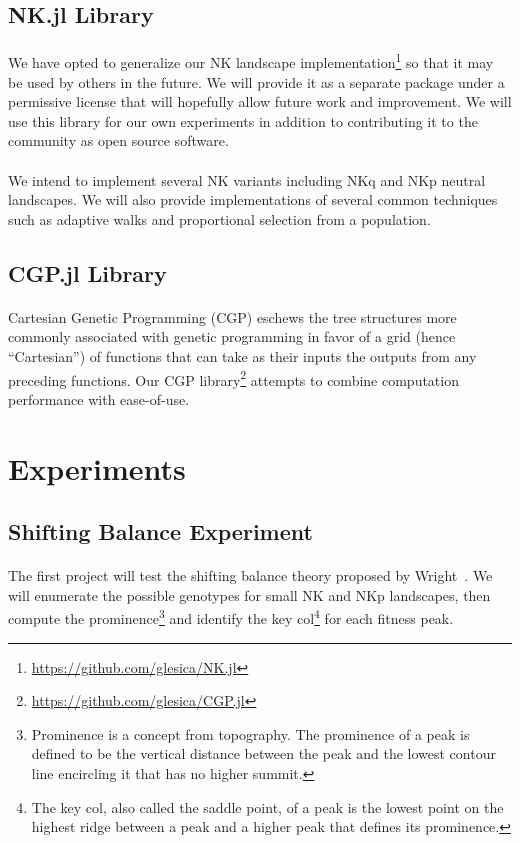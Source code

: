 \documentclass[12pt,letterpaper,titlepage]{article}
\begin{document}
\subsection{NK.jl Library}

\paragraph{}
We have opted to generalize our NK landscape
implementation\footnote{\url{https://github.com/glesica/NK.jl}} so that it may
be used by others in the future. We will provide it as a separate package under
a permissive license that will hopefully allow future work and improvement.  We
will use this library for our own experiments in addition to contributing it to
the community as open source software.

\paragraph{}
We intend to implement several NK variants including NKq and NKp neutral
landscapes. We will also provide implementations of several common techniques
such as adaptive walks and proportional selection from a population.

\subsection{CGP.jl Library}

\paragraph{}
Cartesian Genetic Programming (CGP) eschews the tree structures more commonly
associated with genetic programming in favor of a grid (hence ``Cartesian'') of
functions that can take as their inputs the outputs from any preceding
functions. Our CGP library\footnote{\url{https://github.com/glesica/CGP.jl}}
attempts to combine computation performance with ease-of-use.

\section{Experiments}

\subsection{Shifting Balance Experiment}

\paragraph{}
The first project will test the shifting balance theory proposed by
Wright~\cite{Wright1982}\cite{Wright1931}. We will enumerate the possible
genotypes for small NK and NKp landscapes, then compute the
prominence\footnote{Prominence is a concept from topography. The prominence of
a peak is defined to be the vertical distance between the peak and the
lowest contour line encircling it that has no higher summit.} and identify the
key col\footnote{The key col, also called the saddle point, of a peak is the
lowest point on the highest ridge between a peak and a higher peak that
defines its prominence.} for each fitness peak.
\end{document}
